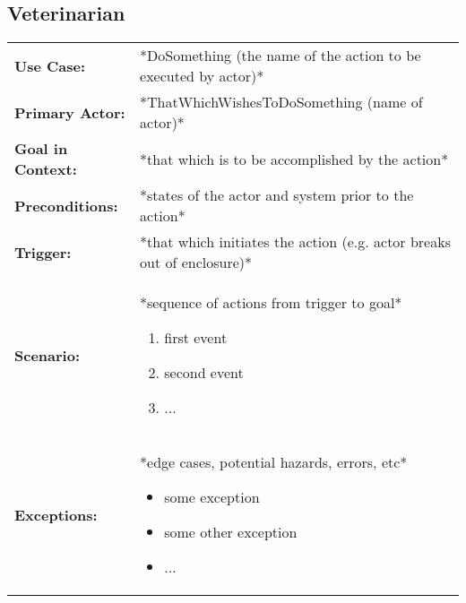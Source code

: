 \documentclass[12pt]{article}
\begin{document}
    
    
    \subsection{Veterinarian}
    \begin{table}[H]
    \begin{tabular}{lp{9.9cm}}
        \hline
        \textbf{Use Case:}                     & *DoSomething (the name of the action to be executed by actor)* \\

        \textbf{Primary Actor:}                & *ThatWhichWishesToDoSomething (name of actor)*\\

        \textbf{Goal in Context:}              & *that which is to be accomplished by the action* \\

        \textbf{Preconditions:}                & *states of the actor and system prior to the action* \\

        \textbf{Trigger:}                      & *that which initiates the action (e.g. actor breaks out of enclosure)*\\

        \textbf{Scenario:}                     & *sequence of actions from trigger to goal*
                                                 \begin{enumerate}
                                                     \item first event
                                                     \item second event
                                                     \item ...
                                                 \end{enumerate} \\

        \textbf{Exceptions:}                   & *edge cases, potential hazards, errors, etc*
                                                 \begin{itemize}
                                                     \item[] some exception
                                                     \item[] some other exception
                                                     \item[] ...
                                                 \end{itemize}\\


\end{tabular}
\end{table}
\end{document}
